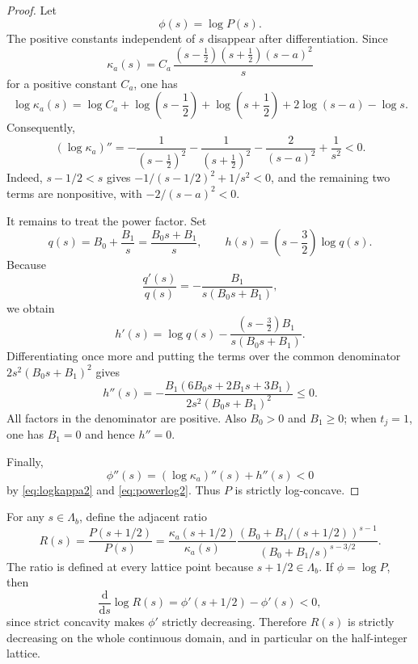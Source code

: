 \documentclass[11pt]{amsart}
\theoremstyle{definition}
\begin{document}
\begin{proof}
Let
\[
 \phi(s)=\log P(s).
\]
The positive constants independent of $s$ disappear after differentiation.  Since
\[
 \kappa_a(s)=C_a\,
 \frac{(s-\frac12)(s+\frac12)(s-a)^2}{s}
\]
for a positive constant $C_a$, one has
\[
 \log\kappa_a(s)
 =\log C_a+
 \log\left(s-\frac12\right)
 +\log\left(s+\frac12\right)
 +2\log(s-a)-\log s.
\]
Consequently,
\begin{equation}\label{eq:logkappa2}
 (\log\kappa_a)''
 =-\frac1{(s-\frac12)^2}
  -\frac1{(s+\frac12)^2}
  -\frac2{(s-a)^2}
  +\frac1{s^2}<0.
\end{equation}
Indeed, $s-1/2<s$ gives
$-1/(s-1/2)^2+1/s^2<0$, and the remaining two terms are nonpositive, with $-2/(s-a)^2<0$.

It remains to treat the power factor.  Set
\[
 q(s)=B_0+\frac{B_1}{s}=\frac{B_0s+B_1}{s},
 \qquad
 h(s)=\left(s-\frac32\right)\log q(s).
\]
Because
\[
 \frac{q'(s)}{q(s)}
 =-\frac{B_1}{s(B_0s+B_1)},
\]
we obtain
\[
 h'(s)
 =\log q(s)
 -\frac{(s-\frac32)B_1}{s(B_0s+B_1)}.
\]
Differentiating once more and putting the terms over the common denominator
$2s^2(B_0s+B_1)^2$ gives
\begin{equation}\label{eq:powerlog2}
 h''(s)
 =-\frac{B_1(6B_0s+2B_1s+3B_1)}
 {2s^2(B_0s+B_1)^2}\le0.
\end{equation}
All factors in the denominator are positive.  Also $B_0>0$ and $B_1\ge0$; when $t_j=1$, one has $B_1=0$ and hence $h''=0$.

Finally,
\[
 \phi''(s)=(\log\kappa_a)''(s)+h''(s)<0
\]
by \eqref{eq:logkappa2} and \eqref{eq:powerlog2}.  Thus $P$ is strictly log-concave.
\end{proof}

For any $s\in\Lambda_b$, define the adjacent ratio
\begin{equation}\label{eq:ratio-def}
 R(s)=\frac{P(s+1/2)}{P(s)}
 =\frac{\kappa_a(s+1/2)}{\kappa_a(s)}
 \frac{\left(B_0+B_1/(s+1/2)\right)^{s-1}}
      {\left(B_0+B_1/s\right)^{s-3/2}}.
\end{equation}
The ratio is defined at every lattice point because $s+1/2\in\Lambda_b$.
If $\phi=\log P$, then
\[
 \frac{\mathrm d}{\mathrm ds}\log R(s)
 =\phi'(s+1/2)-\phi'(s)<0,
\]
since strict concavity makes $\phi'$ strictly decreasing.  Therefore $R(s)$ is strictly decreasing on the whole continuous domain, and in particular on the half-integer lattice.
\end{document}
